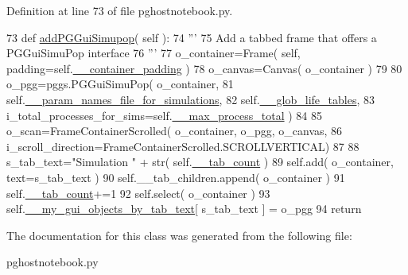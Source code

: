Definition at line 73 of file pghostnotebook.\+py.


\begin{DoxyCode}
73     \textcolor{keyword}{def }\hyperlink{classnegui_1_1pghostnotebook_1_1PGHostNotebook_af595ed4592e623ef403a5e9e7c1e930e}{addPGGuiSimupop}( self ):
74         \textcolor{stringliteral}{'''}
75 \textcolor{stringliteral}{        Add a tabbed frame that offers a PGGuiSimuPop interface}
76 \textcolor{stringliteral}{        '''}
77         o\_container=Frame( self, padding=self.\hyperlink{classnegui_1_1pghostnotebook_1_1PGHostNotebook_a790570fc06951c4ccc142a26c01668ef}{\_\_container\_padding} )
78         o\_canvas=Canvas( o\_container )
79 
80         o\_pgg=pggs.PGGuiSimuPop( o\_container, 
81                         self.\hyperlink{classnegui_1_1pghostnotebook_1_1PGHostNotebook_a9b145ef56ff954c480d856859fcda86e}{\_\_param\_names\_file\_for\_simulations}, 
82                         self.\hyperlink{classnegui_1_1pghostnotebook_1_1PGHostNotebook_af63d9ae9cde1ec2155d4dc81934d00c7}{\_\_glob\_life\_tables}, 
83                         i\_total\_processes\_for\_sims=self.\hyperlink{classnegui_1_1pghostnotebook_1_1PGHostNotebook_a14287e3e1cf5c33d9be0ff28d031fc04}{\_\_max\_process\_total} )
84 
85         o\_scan=FrameContainerScrolled( o\_container, o\_pgg, o\_canvas, 
86         i\_scroll\_direction=FrameContainerScrolled.SCROLLVERTICAL)
87 
88         s\_tab\_text=\textcolor{stringliteral}{"Simulation "} + str( self.\hyperlink{classnegui_1_1pghostnotebook_1_1PGHostNotebook_a84a7417cc57500cbe5c230449ba464b3}{\_\_tab\_count} )
89         self.add( o\_container, text=s\_tab\_text )
90         self.\_\_tab\_children.append( o\_container )
91         self.\hyperlink{classnegui_1_1pghostnotebook_1_1PGHostNotebook_a84a7417cc57500cbe5c230449ba464b3}{\_\_tab\_count}+=1
92         self.select( o\_container )
93         self.\hyperlink{classnegui_1_1pghostnotebook_1_1PGHostNotebook_af4966fb6fc80c08cd38bf21b2c723364}{\_\_my\_gui\_objects\_by\_tab\_text}[ s\_tab\_text ] = o\_pgg 
94         \textcolor{keywordflow}{return}
\end{DoxyCode}


The documentation for this class was generated from the following file\+:\begin{DoxyCompactItemize}
\item 
pghostnotebook.\+py\end{DoxyCompactItemize}
